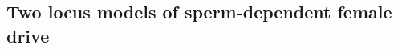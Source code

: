\documentclass[12pt,letterpaper]{article}
\newcommand{\gc}[1]{{ \color{red} #1}}
\begin{document}

\subsection*{Two locus models of sperm-dependent female drive}

\end{document}
